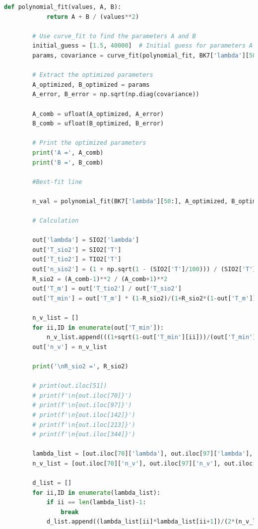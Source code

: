 \documentclass[a4paper,11pt]{article}
\begin{document}
\begin{lstlisting}[language=Python, basicstyle=\tiny, breaklines=true, postbreak=\mbox{\textbackslashspace}]
        def polynomial_fit(values, A, B):
            return A + B / (values**2)

        # Use curve_fit to find the parameters A and B
        initial_guess = [1.5, 40000]  # Initial guess for parameters A and B
        params, covariance = curve_fit(polynomial_fit, BK7['lambda'][50:], BK7['n'][50:], p0=initial_guess)

        # Extract the optimized parameters
        A_optimized, B_optimized = params
        A_error, B_error = np.sqrt(np.diag(covariance))

        A_comb = ufloat(A_optimized, A_error)
        B_comb = ufloat(B_optimized, B_error)

        # Print the optimized parameters
        print('A =', A_comb)
        print('B =', B_comb)

        #Best-fit line

        n_val = polynomial_fit(BK7['lambda'][50:], A_optimized, B_optimized)

        # Calculation 

        out['lambda'] = SIO2['lambda']
        out['T_sio2'] = SIO2['T']
        out['T_tio2'] = TIO2['T']
        out['n_sio2'] = (1 + np.sqrt(1 - (SIO2['T']/100))) / (SIO2['T']/100)
        R_sio2 = (A_comb-1)**2 / (A_comb+1)**2
        out['T_m'] = out['T_tio2'] / out['T_sio2']
        out['T_min'] = out['T_m'] * (1-R_sio2)/(1+R_sio2*(1-out['T_m']))

        n_v_list = []
        for ii,ID in enumerate(out['T_min']):
            n_v_list.append(((1+sqrt(1-out['T_min'][ii]))/(out['T_min'][ii])) * sqrt(A_comb))
        out['n_v'] = n_v_list

        print('\nR_sio2 =', R_sio2)

        # print(out.iloc[51])
        # print(f'\n{out.iloc[70]}')
        # print(f'\n{out.iloc[97]}')
        # print(f'\n{out.iloc[142]}')
        # print(f'\n{out.iloc[213]}')
        # print(f'\n{out.iloc[344]}')

        lambda_list = [out.iloc[70]['lambda'], out.iloc[97]['lambda'], out.iloc[142]['lambda'], out.iloc[213]['lambda'], out.iloc[344]['lambda']]
        n_v_list = [out.iloc[70]['n_v'], out.iloc[97]['n_v'], out.iloc[142]['n_v'], out.iloc[213]['n_v'], out.iloc[344]['n_v']]

        d_list = []
        for ii,ID in enumerate(lambda_list):
            if ii == len(lambda_list)-1:
                break
            d_list.append((lambda_list[ii]*lambda_list[ii+1])/(2*(n_v_list[ii]*lambda_list[ii+1]-n_v_list[ii+1]*lambda_list[ii])))


\end{lstlisting}
\end{document}
